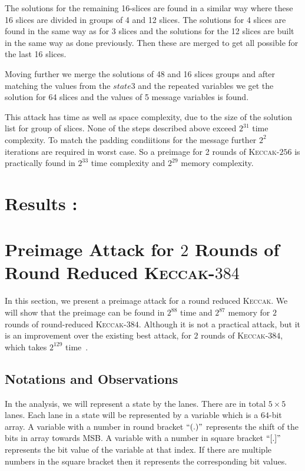 \documentclass[runningheads]{llncs}
\newcommand{\KECCAK}{\mbox{\textsc{Keccak}}}
\newcommand{\Keccak}{\mbox{\textsc{Keccak}}}
\begin{document}
The solutions for the remaining 16-slices are found in a similar way where these 16 slices are divided in groups of 4 and 12 slices. The solutions for 4 slices are found in the same way as for 3 slices and the solutions for the 12 slices are built in the same way as done previously. Then these are merged to get all possible for the last 16 slices.

Moving further we merge the solutions of 48 and 16 slices groups and after matching the values from the $state3$ and the repeated variables we get the solution for 64 slices and the values of 5 message variables is found. 

This attack has time as well as space complexity, due to the size of the solution list for group of slices. None of the steps described above exceed $2^{31}$ time complexity. To match the padding condiitions for the message further $2^2$ iterations are required in worst case. So a preimage for 2 rounds of \KECCAK-$256$ is practically found in $2^{33}$ time complexity and $2^{29}$ memory complexity.

\section{Results :}

\section{Preimage Attack for $2$ Rounds of Round Reduced \KECCAK-$384$}

In this section, we present a preimage attack for a round reduced \KECCAK{}. We will show that the preimage can be found in $2^{88}$ time and $2^{87}$ memory for $2$ rounds of round-reduced \Keccak-$384$. Although it is not a practical attack, but it is an improvement over the existing best attack, for $2$ rounds of \Keccak-$384$, which takes $2^{129}$ time~\cite{guo2016linear}.


\subsection{Notations and Observations}
In the analysis, we will represent a state by the lanes. There are in total $5\times 5$ lanes. Each lane in a state will be represented by a variable which is a $64$-bit array. 
A variable with a number in round bracket $``( . )"$ represents the shift of the bits in array towards MSB. A variable with a number in square bracket $``[ . ]"$ represents the bit value of the variable at that index. If there are multiple numbers in the square bracket then it represents the corresponding bit values.
\end{document}
